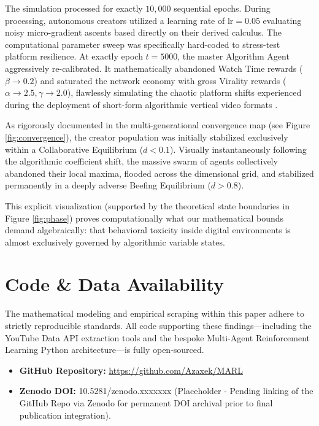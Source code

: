 \documentclass[12pt,letterpaper]{article}
\begin{document}
The simulation processed for exactly $10,000$ sequential epochs. During processing, autonomous creators utilized a learning rate of $\text{lr} = 0.05$ evaluating noisy micro-gradient ascents based directly on their derived calculus. The computational parameter sweep was specifically hard-coded to stress-test platform resilience. At exactly epoch $t=5000$, the master Algorithm Agent aggressively re-calibrated. It mathematically abandoned Watch Time rewards ($\beta \rightarrow 0.2$) and saturated the network economy with gross Virality rewards ($\alpha \rightarrow 2.5, \gamma \rightarrow 2.0$), flawlessly simulating the chaotic platform shifts experienced during the deployment of short-form algorithmic vertical video formats \cite{verwiebe2024mercurial}.

As rigorously documented in the multi-generational convergence map (see Figure \ref{fig:convergence}), the creator population was initially stabilized exclusively within a Collaborative Equilibrium ($d < 0.1$). Visually instantaneously following the algorithmic coefficient shift, the massive swarm of agents collectively abandoned their local maxima, flooded across the dimensional grid, and stabilized permanently in a deeply adverse Beefing Equilibrium ($d > 0.8$). 

This explicit visualization (supported by the theoretical state boundaries in Figure \ref{fig:phase}) proves computationally what our mathematical bounds demand algebraically: that behavioral toxicity inside digital environments is almost exclusively governed by algorithmic variable states.

\section{Code \& Data Availability}

The mathematical modeling and empirical scraping within this paper adhere to strictly reproducible standards. All code supporting these findings—including the YouTube Data API extraction tools and the bespoke Multi-Agent Reinforcement Learning Python architecture—is fully open-sourced.

\begin{itemize}
    \item \textbf{GitHub Repository:} \url{https://github.com/Azaxek/MARL}
    \item \textbf{Zenodo DOI:} 10.5281/zenodo.xxxxxxx (Placeholder - Pending linking of the GitHub Repo via Zenodo for permanent DOI archival prior to final publication integration).
\end{itemize}
\end{document}
